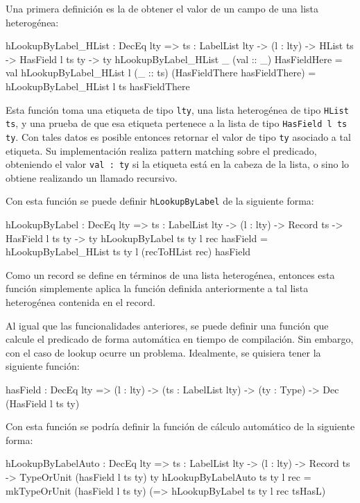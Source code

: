 Una primera definición es la de obtener el valor de un campo de una lista heterogénea:

\begin{code}
hLookupByLabel_HList : DecEq lty => {ts : LabelList lty} ->
  (l : lty) -> HList ts -> HasField l ts ty -> ty
hLookupByLabel_HList _ (val :: _) HasFieldHere = val
hLookupByLabel_HList l (_ :: ts) 
  (HasFieldThere hasFieldThere) =
  hLookupByLabel_HList l ts hasFieldThere
\end{code}

Esta función toma una etiqueta de tipo \texttt{lty}, una lista heterogénea de tipo \texttt{HList ts}, y una prueba de que esa etiqueta pertenece a la lista de tipo \texttt{HasField l ts ty}. Con tales datos es posible entonces retornar el valor de tipo \texttt{ty} asociado a tal etiqueta. Su implementación realiza pattern matching sobre el predicado, obteniendo el valor \texttt{val : ty} si la etiqueta está en la cabeza de la lista, o sino lo obtiene realizando un llamado recursivo.

Con esta función se puede definir \texttt{hLookupByLabel} de la siguiente forma:

\begin{code}
hLookupByLabel : DecEq lty => {ts : LabelList lty} ->
  (l : lty) -> Record ts -> HasField l ts ty -> ty
hLookupByLabel {ts} {ty} l rec hasField =
  hLookupByLabel_HList {ts} {ty} l (recToHList rec) hasField
\end{code}

Como un record se define en términos de una lista heterogénea, entonces esta función simplemente aplica la función definida anteriormente a tal lista heterogénea contenida en el record.

Al igual que las funcionalidades anteriores, se puede definir una función que calcule el predicado de forma automática en tiempo de compilación. Sin embargo, con el caso de lookup ocurre un problema. Idealmente, se quisiera tener la siguiente función:

\begin{code}
hasField : DecEq lty => (l : lty) ->
  (ts : LabelList lty) -> (ty : Type) ->
  Dec (HasField l ts ty)
\end{code}

Con esta función se podría definir la función de cálculo automático de la siguiente forma:

\begin{code}
hLookupByLabelAuto : DecEq lty => {ts : LabelList lty} ->
  (l : lty) -> Record ts ->
  TypeOrUnit (hasField l ts ty) ty
hLookupByLabelAuto {ts} {ty} l rec =
  mkTypeOrUnit (hasField l ts ty)
  (\tsHasL => hLookupByLabel {ts} {ty} l rec tsHasL)
\end{code}

